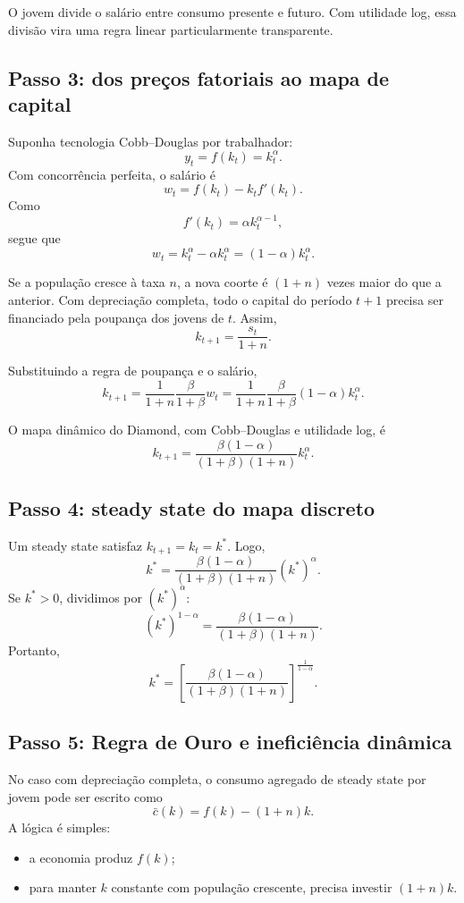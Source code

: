 \documentclass[11pt,a4paper]{article}
\begin{document}
\begin{intuicao}
O jovem divide o sal\'ario entre consumo presente e futuro. Com utilidade log,
essa divis\~ao vira uma regra linear particularmente transparente.
\end{intuicao}

\subsection{Passo 3: dos pre\c{c}os fatoriais ao mapa de capital}

Suponha tecnologia Cobb--Douglas por trabalhador:
\[
y_t=f(k_t)=k_t^\alpha.
\]
Com concorr\^encia perfeita, o sal\'ario \'e
\[
w_t=f(k_t)-k_t f'(k_t).
\]
Como
\[
f'(k_t)=\alpha k_t^{\alpha-1},
\]
segue que
\[
w_t
=
k_t^\alpha-\alpha k_t^\alpha
=
(1-\alpha)k_t^\alpha.
\]

Se a popula\c{c}\~ao cresce \`a taxa \(n\), a nova coorte \'e \((1+n)\) vezes
maior do que a anterior. Com deprecia\c{c}\~ao completa, todo o capital do
per\'iodo \(t+1\) precisa ser financiado pela poupan\c{c}a dos jovens de \(t\).
Assim,
\[
k_{t+1}=\frac{s_t}{1+n}.
\]

Substituindo a regra de poupan\c{c}a e o sal\'ario,
\[
k_{t+1}
=
\frac{1}{1+n}\frac{\beta}{1+\beta}w_t
=
\frac{1}{1+n}\frac{\beta}{1+\beta}(1-\alpha)k_t^\alpha.
\]

\begin{resultado}
O mapa din\^amico do Diamond, com Cobb--Douglas e utilidade log, \'e
\[
k_{t+1}
=
\frac{\beta(1-\alpha)}{(1+\beta)(1+n)}k_t^\alpha.
\]
\end{resultado}

\subsection{Passo 4: steady state do mapa discreto}

Um steady state satisfaz \(k_{t+1}=k_t=k^\ast\). Logo,
\[
k^\ast
=
\frac{\beta(1-\alpha)}{(1+\beta)(1+n)}(k^\ast)^\alpha.
\]
Se \(k^\ast>0\), dividimos por \((k^\ast)^\alpha\):
\[
(k^\ast)^{1-\alpha}
=
\frac{\beta(1-\alpha)}{(1+\beta)(1+n)}.
\]
Portanto,
\[
k^\ast
=
\left[
\frac{\beta(1-\alpha)}{(1+\beta)(1+n)}
\right]^{\frac{1}{1-\alpha}}.
\]

\subsection{Passo 5: Regra de Ouro e inefici\^encia din\^amica}

No caso com deprecia\c{c}\~ao completa, o consumo agregado de steady state por
jovem pode ser escrito como
\[
\bar c(k)=f(k)-(1+n)k.
\]
A l\'ogica \'e simples:
\begin{itemize}
  \item a economia produz \(f(k)\);
  \item para manter \(k\) constante com popula\c{c}\~ao crescente, precisa investir
  \((1+n)k\).
\end{itemize}
\end{document}
